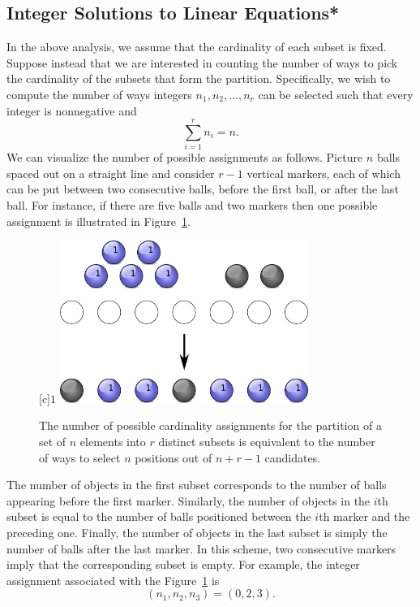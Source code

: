 \subsection{Integer Solutions to Linear Equations*}

In the above analysis, we assume that the cardinality of each subset is fixed.
Suppose instead that we are interested in counting the number of ways to pick the cardinality of the subsets that form the partition. 
Specifically, we wish to compute the number of ways integers $n_1, n_2, \ldots, n_r$ can be selected such that every integer is nonnegative and
\begin{equation*}
\sum_{i = 1}^r n_i = n.
\end{equation*}
We can visualize the number of possible assignments as follows.
Picture $n$ balls spaced out on a straight line and consider $r-1$ vertical markers, each of which can be put between two consecutive balls, before the first ball, or after the last ball. 
For instance, if there are five balls and two markers then one possible assignment is illustrated in Figure~\ref{figure:Partitioning}.

\begin{figure}[htb!]
\begin{center}
\begin{psfrags}
[c]{$1$}
\includegraphics[height=5.28cm]{Figures/4Chapter/partitioning}
\end{psfrags}
\caption{The number of possible cardinality assignments for the partition of a set of $n$ elements into $r$ distinct subsets is equivalent to the number of ways to select $n$ positions out of $n + r - 1$ candidates.} 
\label{figure:Partitioning}
\end{center}
\end{figure}

The number of objects in the first subset corresponds to the number of balls appearing before the first marker.
Similarly, the number of objects in the $i$th subset is equal to the number of balls positioned between the $i$th marker and the preceding one.
Finally, the number of objects in the last subset is simply the number of balls after the last marker.
In this scheme, two consecutive markers imply that the corresponding subset is empty.
For example, the integer assignment associated with the Figure~\ref{figure:Partitioning} is
\begin{equation*}
(n_1, n_2, n_3) = (0,2,3).
\end{equation*}

